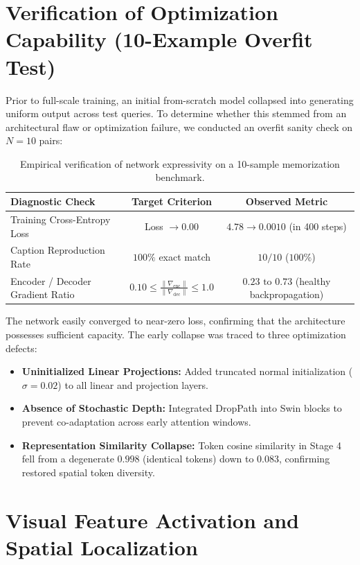 \section{Verification of Optimization Capability (10-Example Overfit Test)}

Prior to full-scale training, an initial from-scratch model collapsed into generating uniform output across test queries. To determine whether this stemmed from an architectural flaw or optimization failure, we conducted an overfit sanity check on $N = 10$ pairs:

\begin{table}[!htbp]
\centering
\small
\caption{Empirical verification of network expressivity on a 10-sample memorization benchmark.}
\begin{tabular}{@{}lcc@{}}
\toprule
\textbf{Diagnostic Check} & \textbf{Target Criterion} & \textbf{Observed Metric} \\
\midrule
Training Cross-Entropy Loss & Loss $\to 0.00$ & $4.78 \to 0.0010$ (in 400 steps) \\
Caption Reproduction Rate & $100\%$ exact match & $10 / 10$ ($100\%$) \\
Encoder / Decoder Gradient Ratio & $0.10 \le \frac{\|\nabla_{\text{enc}}\|}{\|\nabla_{\text{dec}}\|} \le 1.0$ & $0.23 \text{ to } 0.73$ (healthy backpropagation) \\
\bottomrule
\end{tabular}
\end{table}

The network easily converged to near-zero loss, confirming that the architecture possesses sufficient capacity. The early collapse was traced to three optimization defects:
\begin{itemize}
\item \textbf{Uninitialized Linear Projections:} Added truncated normal initialization ($\sigma = 0.02$) to all linear and projection layers.
\item \textbf{Absence of Stochastic Depth:} Integrated DropPath into Swin blocks to prevent co-adaptation across early attention windows.
\item \textbf{Representation Similarity Collapse:} Token cosine similarity in Stage 4 fell from a degenerate $0.998$ (identical tokens) down to $0.083$, confirming restored spatial token diversity.
\end{itemize}

\section{Visual Feature Activation and Spatial Localization}

